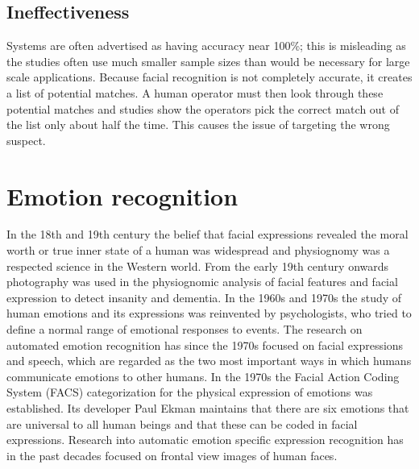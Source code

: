 \documentclass[12pt,letterpaper, onecolumn]{exam}
\begin{document}
    \subsection{Ineffectiveness}
    Systems are often advertised as having accuracy near 100\%; this is misleading as the studies often use much smaller sample sizes than would be necessary for large scale applications. Because facial recognition is not completely accurate, it creates a list of potential matches. A human operator must then look through these potential matches and studies show the operators pick the correct match out of the list only about half the time. This causes the issue of targeting the wrong suspect.
\section{Emotion recognition}
In the 18th and 19th century the belief that facial expressions revealed the moral worth or true inner state of a human was widespread and physiognomy was a respected science in the Western world. From the early 19th century onwards photography was used in the physiognomic analysis of facial features and facial expression to detect insanity and dementia. In the 1960s and 1970s the study of human emotions and its expressions was reinvented by psychologists, who tried to define a normal range of emotional responses to events. The research on automated emotion recognition has since the 1970s focused on facial expressions and speech, which are regarded as the two most important ways in which humans communicate emotions to other humans. In the 1970s the Facial Action Coding System (FACS) categorization for the physical expression of emotions was established. Its developer Paul Ekman maintains that there are six emotions that are universal to all human beings and that these can be coded in facial expressions. Research into automatic emotion specific expression recognition has in the past decades focused on frontal view images of human faces.
\end{document}

